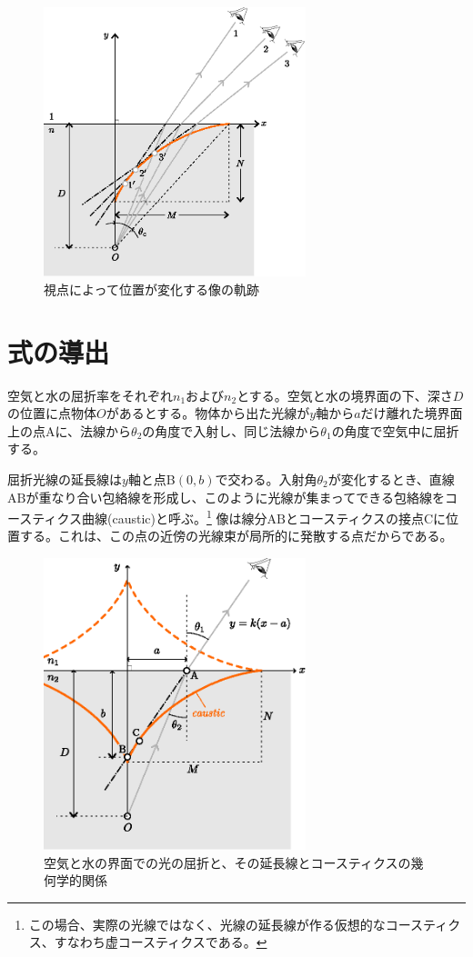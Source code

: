 \documentclass[twocolumn]{article}
\begin{document}
\begin{figure}
	\centering
	\includegraphics[width=3in]{figs/g409.eps}
	\caption{視点によって位置が変化する像の軌跡}
	\label{fig:caustic}
\end{figure}
	
\section{式の導出}

空気と水の屈折率をそれぞれ$n_1$および$n_2$とする。空気と水の境界面の下、深さ$D$の位置に点物体$O$があるとする。物体から出た光線が$y$軸から$a$だけ離れた境界面上の点Aに、法線から$\theta_2$の角度で入射し、同じ法線から$\theta_1$の角度で空気中に屈折する。

屈折光線の延長線は$y$軸と点B$(0, b)$で交わる。入射角$\theta_2$が変化するとき、直線${\mathrm{AB}}$が重なり合い包絡線を形成し、このように光線が集まってできる包絡線をコースティクス曲線(caustic)と呼ぶ。\footnote{この場合、実際の光線ではなく、光線の延長線が作る仮想的なコースティクス、すなわち虚コースティクスである。} 像は線分${\mathrm{AB}}$とコースティクスの接点$\mathrm{C}$に位置する。これは、この点の近傍の光線束が局所的に発散する点だからである。

\begin{figure}
	\centering
	\includegraphics[width=3in]{figs/g237.eps}
	\caption{空気と水の界面での光の屈折と、その延長線とコースティクスの幾何学的関係}
	\label{fig:geometry}
\end{figure}
	
\end{document}
